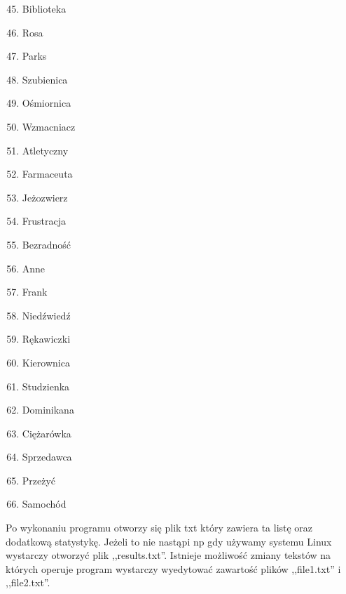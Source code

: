 \documentclass[12pt,a4paper]{article}
\begin{document}
\begin{minipage}[t]{0.3\textwidth}
\begin{enumerate}
\setcounter{enumi}{44}
\item Biblioteka
\item Rosa
\item Parks
\item Szubienica
\item Ośmiornica
\item Wzmacniacz
\item Atletyczny
\item Farmaceuta
\item Jeżozwierz
\item Frustracja
\item Bezradność
\item Anne
\item Frank
\item Niedźwiedź
\item Rękawiczki
\item Kierownica
\item Studzienka
\item Dominikana
\item Ciężarówka
\item Sprzedawca
\item Przeżyć
\item Samochód
\end{enumerate}
\end{minipage}
\newpage
Po wykonaniu programu otworzy się plik txt który zawiera ta listę oraz dodatkową statystykę. Jeżeli to nie nastąpi np gdy używamy systemu Linux wystarczy otworzyć plik ,,results.txt''. Istnieje możliwość zmiany tekstów na których operuje program wystarczy wyedytować zawartość plików ,,file1.txt'' i ,,file2.txt''. 
\BlankLine
\end{document}
